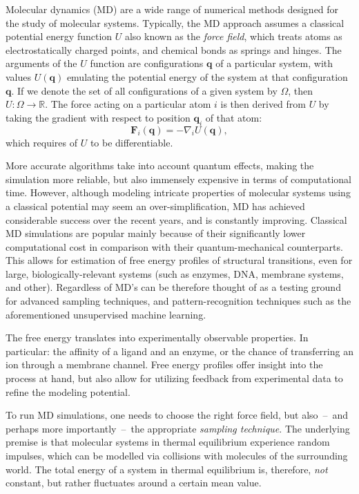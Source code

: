\documentclass[a4paper,11pt,twoside]{book}%
\begin{document}
Molecular dynamics (MD) are a wide range of numerical methods designed for the study of molecular systems.
Typically, the MD approach assumes a classical potential energy function $U$ also known as the \emph{force field}, which treats atoms as electrostatically charged points, and chemical bonds as springs and hinges.
The arguments of the $U$ function are configurations $\mathbf{q}$ of a particular system, with values $U(\mathbf{q})$ emulating the potential energy of the system at that configuration $\mathbf{q}$.
If we denote the set of all configurations of a given system by $\Omega$, then $U\colon\Omega\to\mathbb{R}$. %
The force acting on a particular atom $i$ is then derived from $U$ by taking the gradient with respect to position $\mathbf{q}_i$ of that atom:
$$
\mathbf{F}_i(\mathbf{q}) = -\nabla_i U(\mathbf{q}),
$$
which requires of $U$ to be differentiable. 

More accurate algorithms take into account quantum effects, making the simulation more reliable, but also immensely expensive in terms of computational time.
However, although modeling intricate properties of molecular systems using a classical potential may seem an over-simplification, MD has achieved considerable success over the recent years, and is constantly improving.
Classical MD simulations are popular mainly because of their significantly lower computational cost in comparison with their quantum-mechanical counterparts.
This allows for estimation of free energy profiles of structural transitions, even for large, biologically-relevant systems (such as enzymes, DNA, membrane systems, and other).
Regardless of MD's  can be therefore thought of as a testing ground for advanced sampling techniques, and pattern-recognition techniques such as the aforementioned unsupervised machine learning.

The free energy translates into experimentally observable properties.
In particular: the affinity of a ligand and an enzyme, or the chance of transferring an ion through a membrane channel.
Free energy profiles offer insight into the process at hand, but also allow for utilizing feedback from experimental data to refine the modeling potential.

To run MD simulations, one needs to choose the right force field, but also~--~and perhaps more importantly~--~the appropriate \emph{sampling technique}.
The underlying premise is that molecular systems in thermal equilibrium experience random impulses, which can be modelled via collisions with molecules of the surrounding world.
The total energy of a system in thermal equilibrium is, therefore, \emph{not} constant, but rather fluctuates around a certain mean value.
\end{document}
